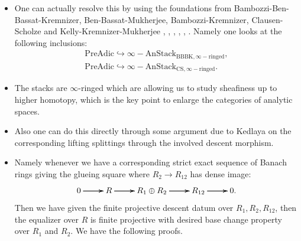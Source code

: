\documentclass[11pt]{report}
\begin{document}
\begin{itemize}
\justifying
\item<1-> One can actually resolve this by using the foundations from Bambozzi-Ben-Bassat-Kremnizer, Ben-Bassat-Mukherjee, Bambozzi-Kremnizer, Clausen-Scholze and Kelly-Kremnizer-Mukherjee \cite{BBBK}, \cite{BBM}, \cite{BK}, \cite{CS2}, \cite{CS1}, \cite{KKM}. Namely one looks at the following inclusions:
\begin{align}
\mathrm{PreAdic}\hookrightarrow \infty-\mathrm{AnStack}_{\mathrm{BBBK},\infty-\mathrm{ringed}},\\
\mathrm{PreAdic}\hookrightarrow \infty-\mathrm{AnStack}_{\mathrm{CS},\infty-\mathrm{ringed}}.
\end{align}

\item<2-> The stacks are $\infty$-ringed which are allowing us to study sheafiness up to higher homotopy, which is the key point to enlarge the categories of analytic spaces.
 
\item<3-> Also one can do this directly through some argument due to Kedlaya on the corresponding lifting splittings through the involved descent morphism. 

\item<4-> Namely whenever we have a corresponding strict exact sequence of Banach rings giving the glueing square where $R_2\rightarrow R_{12}$ has dense image:
\[
\xymatrix@R+0pc@C+0pc{
0  \ar[r]\ar[r]\ar[r] &R \ar[r]\ar[r]\ar[r] &R_1\oplus R_2 \ar[r]\ar[r]\ar[r] &R_{12}  \ar[r]\ar[r]\ar[r] & 0.
}
\] 
Then we have given the finite projective descent datum over $R_1,R_2,R_{12}$, then the equalizer over $R$ is finite projective with desired base change property over $R_1$ and $R_2$. We have the following proofs.


\end{itemize}



	
\end{document}
